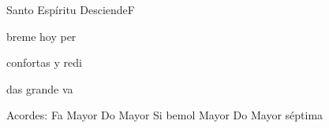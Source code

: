 \documentclass[12pt, spanish]{book}
\begin{document}
\begin{song}{Santo Espíritu Desciende}{F}
\begin{SBOpGroup}
            breme hoy   per

             confortas y redi

             das grande va
        \end{SBOpGroup}

        \ifChordBk
        \begin{SBOpGroup}
            Acordes:
            \upchord{\F}\qquad Fa Mayor \hfill
            \upchord{\C}\qquad Do Mayor \hfill\null\break
            \upchord{\Bflat}\qquad Si bemol Mayor \hfill
            \upchord{\Cseven}\qquad Do Mayor s\'eptima \hfill\null\break
        \end{SBOpGroup}
        \fi
    \end{song}
\end{document}
